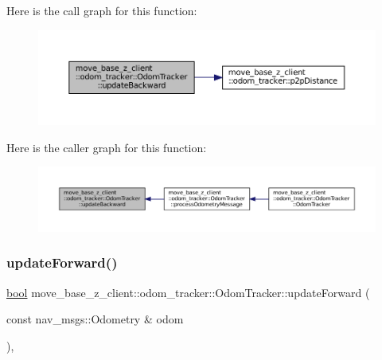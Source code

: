 Here is the call graph for this function\+:
\nopagebreak
\begin{figure}[H]
\begin{center}
\leavevmode
\includegraphics[width=350pt]{classmove__base__z__client_1_1odom__tracker_1_1OdomTracker_ae613af99d85a8aa18c632e76efe41113_cgraph}
\end{center}
\end{figure}
Here is the caller graph for this function\+:
\nopagebreak
\begin{figure}[H]
\begin{center}
\leavevmode
\includegraphics[width=350pt]{classmove__base__z__client_1_1odom__tracker_1_1OdomTracker_ae613af99d85a8aa18c632e76efe41113_icgraph}
\end{center}
\end{figure}
\mbox{\label{classmove__base__z__client_1_1odom__tracker_1_1OdomTracker_a12cee73239bc7685c645f8f52859b61f}} 
\subsubsection{\texorpdfstring{update\+Forward()}{updateForward()}}
{\footnotesize\ttfamily \hyperlink{classbool}{bool} move\+\_\+base\+\_\+z\+\_\+client\+::odom\+\_\+tracker\+::\+Odom\+Tracker\+::update\+Forward (\begin{DoxyParamCaption}\item[{const nav\+\_\+msgs\+::\+Odometry \&}]{odom }\end{DoxyParamCaption})\hspace{0.3cm}{\ttfamily [protected]}, {\ttfamily [virtual]}}

